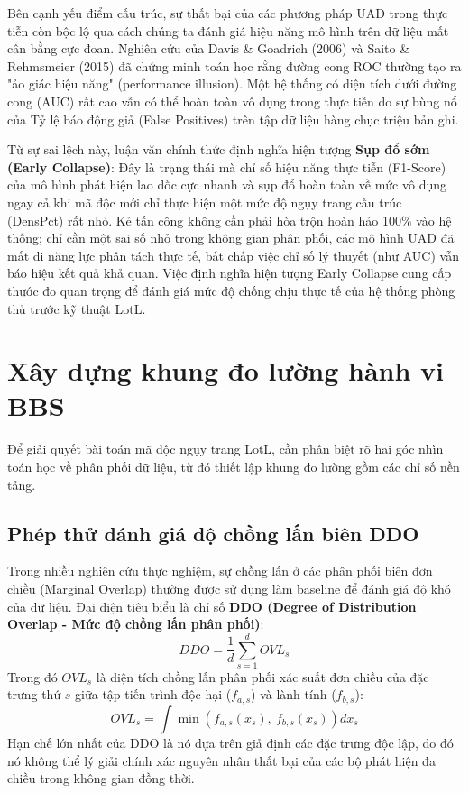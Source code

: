 \documentclass[../main.tex]{subfiles}
\begin{document}
Bên cạnh yếu điểm cấu trúc, sự thất bại của các phương pháp UAD trong thực tiễn còn bộc lộ qua cách chúng ta đánh giá hiệu năng mô hình trên dữ liệu mất cân bằng cực đoan. Nghiên cứu của Davis \& Goadrich (2006) \cite{davis2006relationship} và Saito \& Rehmsmeier (2015) \cite{saito2015precision} đã chứng minh toán học rằng đường cong ROC thường tạo ra "ảo giác hiệu năng" (performance illusion). Một hệ thống có diện tích dưới đường cong (AUC) rất cao vẫn có thể hoàn toàn vô dụng trong thực tiễn do sự bùng nổ của Tỷ lệ báo động giả (False Positives) trên tập dữ liệu hàng chục triệu bản ghi.

Từ sự sai lệch này, luận văn chính thức định nghĩa hiện tượng \textbf{Sụp đổ sớm (Early Collapse)}: Đây là trạng thái mà chỉ số hiệu năng thực tiễn (F1-Score) của mô hình phát hiện lao dốc cực nhanh và sụp đổ hoàn toàn về mức vô dụng ngay cả khi mã độc mới chỉ thực hiện một mức độ ngụy trang cấu trúc (DensPct) rất nhỏ. Kẻ tấn công không cần phải hòa trộn hoàn hảo 100\% vào hệ thống; chỉ cần một sai số nhỏ trong không gian phân phối, các mô hình UAD đã mất đi năng lực phân tách thực tế, bất chấp việc chỉ số lý thuyết (như AUC) vẫn báo hiệu kết quả khả quan. Việc định nghĩa hiện tượng Early Collapse cung cấp thước đo quan trọng để đánh giá mức độ chống chịu thực tế của hệ thống phòng thủ trước kỹ thuật LotL.

\section{Xây dựng khung đo lường hành vi BBS}
\label{section:2.2}

Để giải quyết bài toán mã độc ngụy trang LotL, cần phân biệt rõ hai góc nhìn toán học về phân phối dữ liệu, từ đó thiết lập khung đo lường gồm các chỉ số nền tảng.

\subsection{Phép thử đánh giá độ chồng lấn biên DDO}
Trong nhiều nghiên cứu thực nghiệm, sự chồng lấn ở các phân phối biên đơn chiều (Marginal Overlap) thường được sử dụng làm baseline để đánh giá độ khó của dữ liệu. Đại diện tiêu biểu là chỉ số \textbf{DDO (Degree of Distribution Overlap - Mức độ chồng lấn phân phối)}:
\begin{equation}
    DDO = \frac{1}{d} \sum_{s=1}^{d} OVL_s
\end{equation}
Trong đó $OVL_s$ là diện tích chồng lấn phân phối xác suất đơn chiều của đặc trưng thứ $s$ giữa tập tiến trình độc hại ($f_{a,s}$) và lành tính ($f_{b,s}$):
\begin{equation}
    OVL_s = \int \min\left( f_{a,s}(x_s),\ f_{b,s}(x_s) \right) dx_s
\end{equation}
Hạn chế lớn nhất của DDO là nó dựa trên giả định các đặc trưng độc lập, do đó nó không thể lý giải chính xác nguyên nhân thất bại của các bộ phát hiện đa chiều trong không gian đồng thời.
\end{document}
